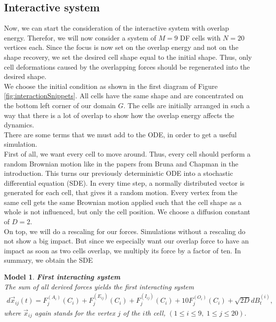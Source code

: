 \documentclass[a4paper,12pt,leqno]{article}
\theoremstyle{plain}
\newtheorem{model}[theorem]{Model}
\theoremstyle{remark}
\begin{document}
\subsection{Interactive system}
Now, we can start the consideration of the interactive system with overlap energy. Therefor, we will now consider a system of $M=9$ DF cells with $N=20$ vertices each. Since the focus is now set on the overlap energy and not on the shape recovery, we set the desired cell shape equal to the initial shape. Thus, only cell deformations caused by the overlapping forces should be regenerated into the desired shape.\\
We choose the initial condition as shown in the first diagram of Figure \ref{fig:interactionSnippets}. All cells have the same shape and are concentrated on the bottom left corner of our domain $G$. The cells are initially arranged in such a way that there is a lot of overlap to show how the overlap energy affects the dynamics.\\
There are some terms that we must add to the ODE, in order to get a useful simulation. \\
First of all, we want every cell to move around. Thus, every cell should perform a random Brownian motion like in the papers from Bruna and Chapman in the introduction. This turns our previously deterministic ODE into a stochastic differential equation (SDE). In every time step, a normally distributed vector is generated for each cell, that gives it a random motion. Every vertex from the same cell gets the same Brownian motion applied such that the cell shape as a whole is not influenced, but only the cell position. We choose a diffusion constant of $D=2$. \\
On top, we will do a rescaling for our forces. Simulations without a rescaling do not show a big impact. But since we especially want our overlap force to have an impact as soon as two cells overlap, we multiply its force by a factor of ten. In summary, we obtain the SDE
\begin{model} \textbf{First interacting system} \label{model:interaction1}\\ 
	The sum of all derived forces yields the first interacting system
	\begin{align}
		d\vec{x}_{ij}(t) =  F^{(A_i)}_j(C_i) + F^{(E_{ij})}_j(C_i) +F^{(I_{ij})}_j(C_i) +10 F^{(O_i)}_j(C_i) + \sqrt{2D} dB_t^{(i)}, \label{eq:interaction1}
	\end{align}
	where $\vec{x}_{ij}$ again stands for the vertex $j$ of the $i$th cell, $(1\leq i \leq9, \; 1\leq j \leq 20)$. 
\end{model}
\end{document}
